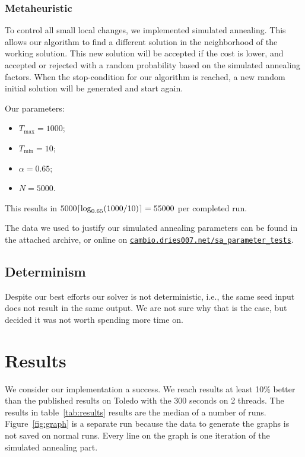 \documentclass[11pt,a4paper]{article}
\DeclarePairedDelimiter{\ceil}{\lceil}{\rceil}
\begin{document}
        \subsubsection{Metaheuristic}\label{subsec:metaheuristic}
            To control all small local changes, we implemented simulated annealing.
            This allows our algorithm to find a different solution in the neighborhood of the working solution.
            This new solution will be accepted if the cost is lower, and accepted or rejected with a random probability based on the simulated annealing factors.
            When the stop-condition for our algorithm is reached, a new random initial solution will be generated and start again.

            Our parameters:
            \begin{itemize} \itemsep-0.25em
                \item $T_{\max} = 1000$;
                \item $T_{\min} = 10$;
                \item $\alpha = 0.65$;
                \item $N = 5000$.
            \end{itemize}
            This results in $5000\ceil{\log_{0.65}(1000/10)} = 55000$ per completed run.

            The data we used to justify our simulated annealing parameters can be found in the attached archive, or online on
            \href{https://cambio.dries007.net/sa_parameter_tests/}{\texttt{cambio.dries007.net/sa\_parameter\_tests}}.

    \subsection{Determinism}\label{subsec:determinism}
        Despite our best efforts our solver is not deterministic, i.e., the same seed input does not result in the same output.
        We are not sure why that is the case, but decided it was not worth spending more time on.


\section{Results}\label{sec:results}

    We consider our implementation a success.
    We reach results at least 10\% better than the published results on Toledo with the 300 seconds on 2 threads.
    The results in table~\ref{tab:results} results are the median of a number of runs.
    Figure~\ref{fig:graph} is a separate run because the data to generate the graphs is not saved on normal runs.
    Every line on the graph is one iteration of the simulated annealing part.
\end{document}
